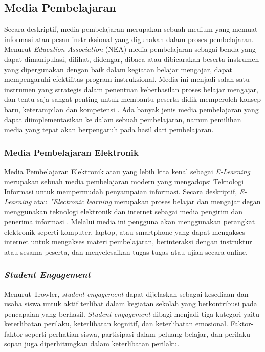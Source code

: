 \subsection{Media Pembelajaran}
Secara deskriptif, media pembelajaran merupakan sebuah medium yang memuat informasi atau pesan instruksional yang digunakan dalam proses pembelajaran\cite{hasan2021media}. 
Menurut \textit{Education Association} (NEA) media pembelajaran sebagai benda yang dapat dimanipulasi, dilihat, didengar, dibaca atau dibicarakan 
beserta instrumen yang dipergunakan dengan baik dalam kegiatan belajar mengajar, dapat mempengaruhi efektifitas program instruksional\cite{arsyad2011media}.
Media ini menjadi salah satu instrumen yang strategis dalam penentuan keberhasilan proses belajar mengajar, dan tentu saja sangat penting untuk membantu peserta didik memperoleh konsep baru, keterampilan dan kompetensi \cite{hasan2021media}.
Ada banyak jenis media pembelajaran yang dapat diimplementasikan ke dalam sebuah pembelajaran, namun pemilihan media yang tepat akan berpengaruh pada hasil dari pembelajaran.
\subsubsection{Media Pembelajaran Elektronik}
Media Pembelajaran Elektronik atau yang lebih kita kenal sebagai \textit{E-Learning} merupakan sebuah media pembelajaran modern yang mengadopsi Teknologi Informasi untuk mempermudah penyampaian informasi.
Secara deskriptif, \textit{E-Learning} atau \textit{"Electronic learning} merupakan proses belajar dan mengajar degan menggunakan teknologi elektronik dan internet sebagai media pengirim dan penerima informasi \cite{hanum2013keefetifan}.
Melalui media ini pengguna akan menggunakan perangkat elektronik seperti komputer, laptop, atau smartphone yang dapat mengakses internet untuk mengakses materi pembelajaran, berinteraksi dengan instruktur atau sesama peserta, dan menyelesaikan tugas-tugas atau ujian secara online.

\subsubsection{\textit{Student Engagement}}
Menurut Trowler, \textit{student engagement} dapat dijelaskan sebagai kesediaan dan usaha siswa untuk aktif terlibat dalam kegiatan sekolah yang berkontribusi pada pencapaian yang berhasil. 
\textit{Student engagement} dibagi menjadi tiga kategori yaitu keterlibatan perilaku, keterlibatan kognitif, dan keterlibatan emosional. Faktor-faktor seperti perhatian siswa, partisipasi dalam peluang belajar, dan perilaku sopan juga diperhitungkan dalam keterlibatan perilaku\cite{trowler2010student}.

